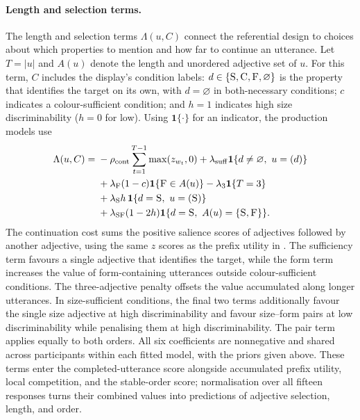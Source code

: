 \documentclass[10pt,a4paper,fleqn]{article}
\newcommand{\adj}[1]{\textsc{#1}}
\begin{document}
\paragraph{Length and selection terms.}
The length and selection terms $\Lambda(u,C)$ connect the referential design to choices about which properties to mention and how far to continue an utterance.
Let $T=|u|$ and $A(u)$ denote the length and unordered adjective set of $u$.
For this term, $C$ includes the display's condition labels: $d\in\{\adj{S},\adj{C},\adj{F},\varnothing\}$ is the property that identifies the target on its own, with $d=\varnothing$ in both-necessary conditions; $c$ indicates a colour-sufficient condition; and $h=1$ indicates high size discriminability ($h=0$ for low).
Using $\mathbf{1}\{\cdot\}$ for an indicator, the production models use
\begin{equation}
\begin{aligned}
\Lambda(u,C)={}&-\rho_{\mathrm{cont}}\sum_{t=1}^{T-1}\max(z_{w_t},0)
 +\lambda_{\mathrm{suff}}\mathbf{1}\{d\ne\varnothing,\ u=(d)\}\\
&+\lambda_{\mathrm{F}}(1-c)\mathbf{1}\{\adj{F}\in A(u)\}
 -\lambda_{3}\mathbf{1}\{T=3\}\\
&+\lambda_{\mathrm{S}}h\,\mathbf{1}\{d=\adj{S},\ u=(\adj{S})\}\\
&+\lambda_{\mathrm{SF}}(1-2h)\mathbf{1}\{d=\adj{S},\ A(u)=\{\adj{S},\adj{F}\}\}.
\end{aligned}
\label{eq:task-link}
\end{equation}
The continuation cost sums the positive salience scores of adjectives followed by another adjective, using the same $z$ scores as the prefix utility in .
The sufficiency term favours a single adjective that identifies the target, while the form term increases the value of form-containing utterances outside colour-sufficient conditions.
The three-adjective penalty offsets the value accumulated along longer utterances.
In size-sufficient conditions, the final two terms additionally favour the single size adjective at high discriminability and favour size--form pairs at low discriminability while penalising them at high discriminability.
The pair term applies equally to both orders.
All six coefficients are nonnegative and shared across participants within each fitted model, with the priors given above.
These terms enter the completed-utterance score alongside accumulated prefix utility, local competition, and the stable-order score; normalisation over all fifteen responses turns their combined values into predictions of adjective selection, length, and order.
\end{document}
